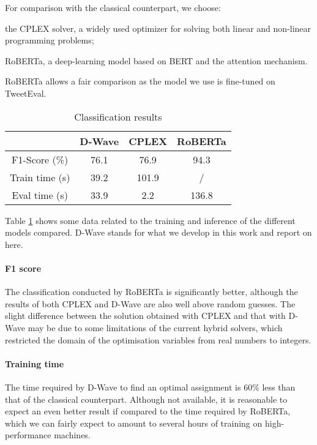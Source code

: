 \documentclass{ceurart}
\begin{document}
For comparison with the classical counterpart, we choose:
\begin{enumerate*}[label=\arabic*)]
    \item the CPLEX\cite{cplex} solver, a widely used optimizer for solving both linear and non-linear programming problems;
    \item RoBERTa\cite{ROBERTA}, a deep-learning model based on BERT\cite{BERT} and the attention mechanism\cite{Attention}.
\end{enumerate*}
RoBERTa allows a fair comparison as the model we use\cite{robertamodel} is fine-tuned on TweetEval.

\begin{table}
    \caption{Classification results}
    \label{tab:classification}
    \begin{tabular}{cccc}
        \toprule
        & D-Wave & CPLEX & RoBERTa \\
        \midrule
        F1-Score (\%) & 76.1 & 76.9 & 94.3 \\
        Train time (s) & 39.2 & 101.9 & / \\
        Eval time (s) & 33.9 & 2.2 & 136.8 \\
        \bottomrule
    \end{tabular}
\end{table}

Table \ref{tab:classification} shows some data related to the training and inference of the different models compared. D-Wave stands for what we develop in this work and report on here.

\paragraph{F1 score} The classification conducted by RoBERTa is significantly better, although the results of both CPLEX and D-Wave are also well above random guesses. The slight difference between the solution obtained with CPLEX and that with D-Wave may be due to some limitations of the current hybrid solvers, which restricted the domain of the optimisation variables from real numbers to integers.

\paragraph{Training time} The time required by D-Wave to find an optimal assignment is 60\% less than that of the classical counterpart. Although not available, it is reasonable to expect an even better result if compared to the time required by RoBERTa, which we can fairly expect to amount to several hours of training on high-performance machines.
\end{document}
